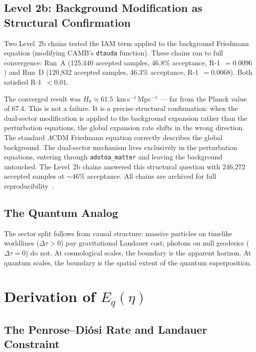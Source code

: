 \documentclass[12pt,letterpaper]{article}
\newcommand{\LCDM}{$\Lambda$CDM}
\begin{document}
\subsection{Level 2b: Background Modification as Structural Confirmation}
\label{sec:level2b}

Two Level~2b chains tested the IAM term applied to the background Friedmann
equation (modifying CAMB's \texttt{dtauda} function). These chains ran to
full convergence: Run~A (125,440 accepted samples, 46.8\% acceptance,
R-1~$= 0.0096$) and Run~D (120,832 accepted samples, 46.3\% acceptance,
R-1~$= 0.0068$). Both satisfied R-1~$< 0.01$.

The converged result was $H_0 \approx 61.5$~km\,s$^{-1}$\,Mpc$^{-1}$ ---
far from the Planck value of 67.4. This is not a failure. It is a precise
structural confirmation: when the dual-sector modification is applied to
the background expansion rather than the perturbation equations, the global
expansion rate shifts in the wrong direction. The standard \LCDM{} Friedmann
equation correctly describes the global background. The dual-sector mechanism
lives exclusively in the perturbation equations, entering through
\texttt{adotoa\_matter} and leaving the background untouched. The Level~2b
chains answered this structural question with 246,272 accepted samples at
$\sim$46\% acceptance. All chains are archived for full
reproducibility~\citep{Mahaffey2026repo}.

\subsection{The Quantum Analog}

The sector split follows from causal structure: massive particles on
timelike worldlines ($\Delta\tau > 0$) pay gravitational Landauer cost;
photons on null geodesics ($\Delta\tau = 0$) do not. At cosmological scales,
the boundary is the apparent horizon. At quantum scales, the boundary is the
spatial extent of the quantum superposition.

\section{Derivation of $E_q(\eta)$}

\subsection{The Penrose--Di\'{o}si Rate and Landauer Constraint}
\end{document}
